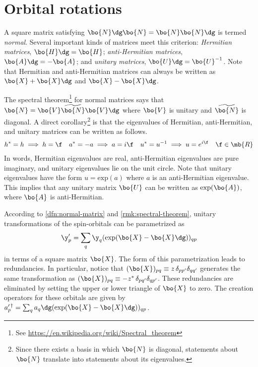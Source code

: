 \chapter{Orbital rotations}
\label{appendix:orbital-rotations}

\begin{dfn}
\label{dfn:normal-matrix}
A square matrix satisfying $\bo{N}\dg\bo{N}=\bo{N}\bo{N}\dg$ is termed \textit{normal}.
Several important kinds of matrices meet this criterion:
\textit{Hermitian matrices}, $\bo{H}\dg=\bo{H}$;
\textit{anti-Hermitian matrices}, $\bo{A}\dg=-\bo{A}$;
and
\textit{unitary matrices}, $\bo{U}\dg=\bo{U}^{-1}$.
Note that Hermitian and anti-Hermitian matrices can always be written as $\bo{X}+\bo{X}\dg$ and $\bo{X}-\bo{X}\dg$.
\end{dfn}

\begin{rmk}
\label{rmk:spectral-theorem}
The spectral theorem\footnote{See \url{https://en.wikipedia.org/wiki/Spectral_theorem}} for normal matrices says that $\bo{N}=\bo{V}\widetilde{\bo{N}}\bo{V}\dg$ where $\bo{V}$ is unitary and $\widetilde{\bo{N}}$ is diagonal.
A direct corollary\footnote{Since there exists a basis in which $\bo{N}$ is diagonal, statements about $\bo{N}$ translate into statements about its eigenvalues.} is that the eigenvalues of Hermitian, anti-Hermitian, and unitary matrices can be written as follows.
\begin{align}
  h^*
=
  h
\implies
  h
=
  \f
&&
  a^*
=
-
  a
\implies
  a
=
  i\f
&&
  u^*
=
  u^{-1}
\implies
  u
=
  e^{i\f}
&&
  \f
\in
  \mb{R}
\end{align}
In words, Hermitian eigenvalues are real, anti-Hermitian eigenvalues are pure imaginary, and unitary eigenvalues lie on the unit circle.
Note that unitary eigenvalues have the form $u=\text{exp}(a)$ where $a$ is an anti-Hermitian eigenvalue.
This implies that any unitary matrix $\bo{U}$ can be written as $\text{exp}(\bo{A})$, where $\bo{A}$ is anti-Hermitian.
\end{rmk}

\begin{rmk}
\label{rmk:spin-orbital-transformation-law}
According to \cref{dfn:normal-matrix} and \cref{rmk:spectral-theorem}, unitary transformations of the spin-orbitals can be parametrized as
\begin{align}
\label{eq:spin-orbital-transformation}
  \y_p'
=
  \sum_q
  \y_q
  (\text{exp}(\bo{X} - \bo{X}\dg))_{qp}
\end{align}
in terms of a square matrix $\bo{X}$.
The form of this parametrization leads to redundancies.
In particular, notice that $(\bo{X})_{pq}\equiv z\,\delta_{pp'}\delta_{qq'}$ generates the same transformation as $(\bo{X})_{pq}\equiv -z^*\,\delta_{pq'}\delta_{qp'}$.
These redundancies are eliminated by setting the upper or lower triangle of $\bo{X}$ to zero.
The creation operators for these orbitals are given by
$
  a_p^{\prime\,\dagger}
=
  \sum_q
  a_q\dg
  (\text{exp}(\bo{X} - \bo{X}\dg))_{qp}
$.
\end{rmk}


